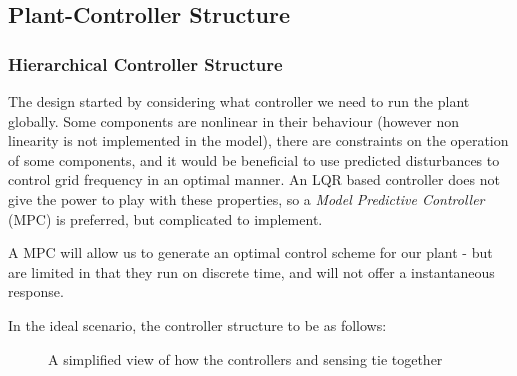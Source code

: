 \subsection{Plant-Controller Structure}
\subsubsection{Hierarchical Controller Structure}

The design started by considering what controller we need to run the plant globally. 
Some components are nonlinear in their behaviour (however non linearity is not implemented in the model), there are constraints on the operation of some components, and it would be beneficial to use predicted disturbances to control grid frequency in an optimal manner.
An LQR based controller does not give the power to play with these properties, so a \emph{Model Predictive Controller} (MPC) is preferred, but complicated to implement.

A MPC will allow us to  generate an optimal control scheme for our plant - but are limited in that they run on discrete time, and will not offer a instantaneous response.

\newpage

In the ideal scenario, the controller structure to be as follows:

\begin{figure}[thb]
        \centering
\usetikzlibrary{arrows}
        \caption{A simplified view of how the controllers and sensing tie together} \label{fig:schematic}
\end{figure}

